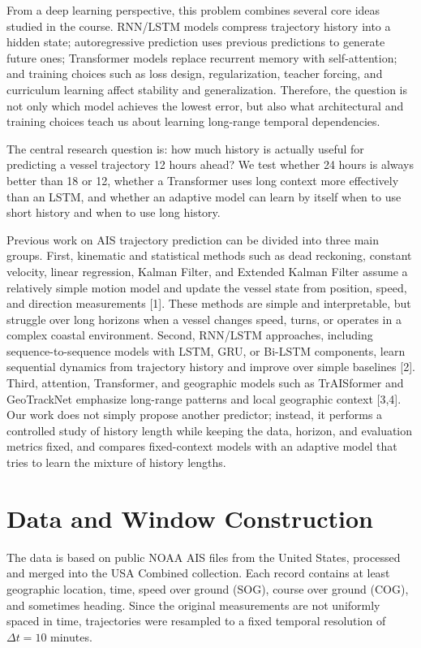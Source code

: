 From a deep learning perspective, this problem combines several core ideas studied in the course. RNN/LSTM models compress trajectory history into a hidden state; autoregressive prediction uses previous predictions to generate future ones; Transformer models replace recurrent memory with self-attention; and training choices such as loss design, regularization, teacher forcing, and curriculum learning affect stability and generalization. Therefore, the question is not only which model achieves the lowest error, but also what architectural and training choices teach us about learning long-range temporal dependencies.

The central research question is: how much history is actually useful for predicting a vessel trajectory 12 hours ahead? We test whether 24 hours is always better than 18 or 12, whether a Transformer uses long context more effectively than an LSTM, and whether an adaptive model can learn by itself when to use short history and when to use long history.

Previous work on AIS trajectory prediction can be divided into three main groups. First, kinematic and statistical methods such as dead reckoning, constant velocity, linear regression, Kalman Filter, and Extended Kalman Filter assume a relatively simple motion model and update the vessel state from position, speed, and direction measurements [1]. These methods are simple and interpretable, but struggle over long horizons when a vessel changes speed, turns, or operates in a complex coastal environment. Second, RNN/LSTM approaches, including sequence-to-sequence models with LSTM, GRU, or Bi-LSTM components, learn sequential dynamics from trajectory history and improve over simple baselines [2]. Third, attention, Transformer, and geographic models such as TrAISformer and GeoTrackNet emphasize long-range patterns and local geographic context [3,4]. Our work does not simply propose another predictor; instead, it performs a controlled study of history length while keeping the data, horizon, and evaluation metrics fixed, and compares fixed-context models with an adaptive model that tries to learn the mixture of history lengths.

\section{Data and Window Construction}
The data is based on public NOAA AIS files from the United States, processed and merged into the USA Combined collection. Each record contains at least geographic location, time, speed over ground (SOG), course over ground (COG), and sometimes heading. Since the original measurements are not uniformly spaced in time, trajectories were resampled to a fixed temporal resolution of $\Delta t=10$ minutes.

